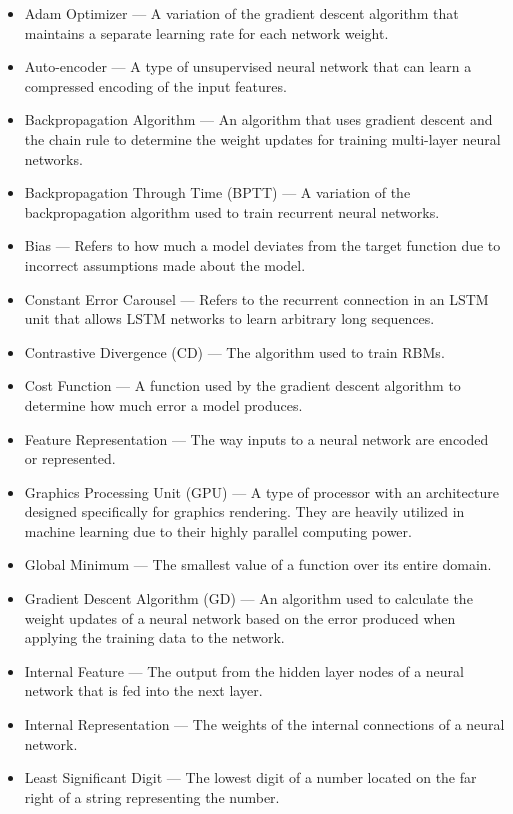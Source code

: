 \begin{itemize}
	\item Adam Optimizer --- A variation of the gradient descent algorithm that maintains a separate learning rate for each network weight.
	\item Auto-encoder --- A type of unsupervised neural network that can learn a compressed encoding of the input features.
	\item Backpropagation Algorithm --- An algorithm that uses gradient descent and the chain rule to determine the weight updates for training multi-layer neural networks.
	\item Backpropagation Through Time (BPTT) --- A variation of the backpropagation algorithm used to train recurrent neural networks.
	\item Bias --- Refers to how much a model deviates from the target function due to incorrect assumptions made about the model.
	\item Constant Error Carousel --- Refers to the recurrent connection in an LSTM unit that allows LSTM networks to learn arbitrary long sequences.
	\item Contrastive Divergence (CD) --- The algorithm used to train RBMs.
	\item Cost Function --- A function used by the gradient descent algorithm to determine how much error a model produces.
	\item Feature Representation --- The way inputs to a neural network are encoded or represented. 
	\item Graphics Processing Unit (GPU) --- A type of processor with an architecture designed specifically for graphics rendering. They are heavily utilized in machine learning due to their highly parallel computing power.
	\item Global Minimum --- The smallest value of a function over its entire domain. 
	\item Gradient Descent Algorithm (GD) --- An algorithm used to calculate the weight updates of a neural network based on the error produced when applying the training data to the network.
	\item Internal Feature --- The output from the hidden layer nodes of a neural network that is fed into the next layer.
	\item Internal Representation --- The weights of the internal connections of a neural network.
	\item Least Significant Digit --- The lowest digit of a number located on the far right of a string representing the number.

\end{itemize}
